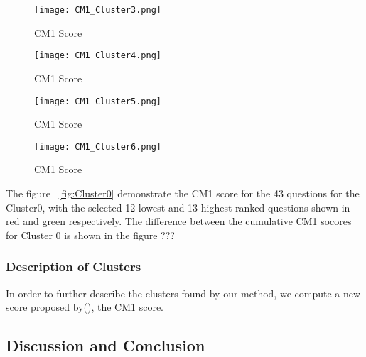 \documentclass{article}
\begin{document}
\begin{figure}[h]
	\texttt{[image: CM1\_Cluster3.png]}
	\caption{CM1 Score}
	\label{fig:Cluster3}
\end{figure}

\begin{figure}[h]
	\texttt{[image: CM1\_Cluster4.png]}
	\caption{CM1 Score}
	\label{fig:Cluster4}
\end{figure}

\begin{figure}[h]
	\texttt{[image: CM1\_Cluster5.png]}
	\caption{CM1 Score}
	\label{fig:Cluster5}
\end{figure}

\begin{figure}[h]
	\texttt{[image: CM1\_Cluster6.png]}
	\caption{CM1 Score}
	\label{fig:Cluster6}
\end{figure}

The figure ~\ref{fig:Cluster0} demonstrate the CM1 score for the 43
questions for the Cluster0, with the selected 12 lowest and 13 highest ranked questions shown in red and green respectively. The difference between the cumulative CM1 socores for Cluster 0 is shown in the figure ??? 


\subsubsection{Description of Clusters}

In order to further describe the clusters found by our method, we compute a new
score proposed by(), the CM1 score.





\subsection{Discussion and Conclusion}
\end{document}
